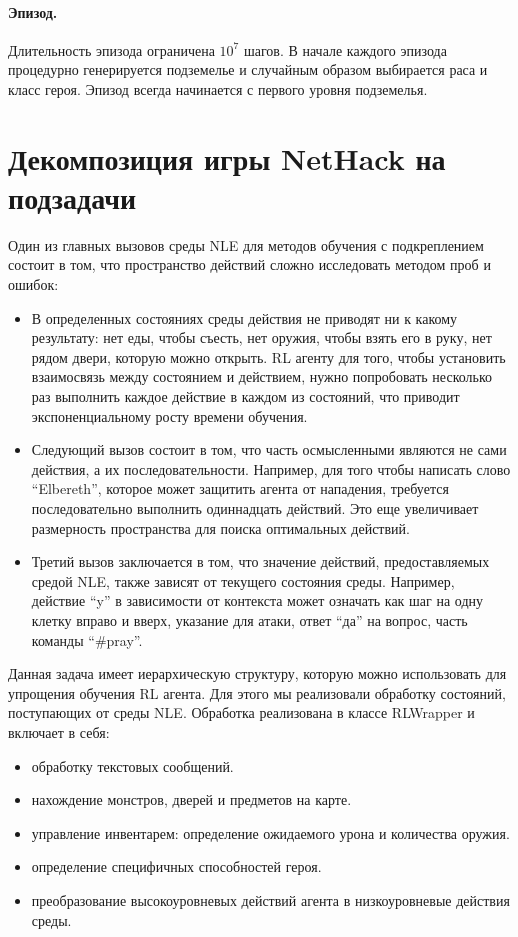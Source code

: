 \paragraph{Эпизод.}
Длительность эпизода ограничена $10^7$ шагов. В начале каждого эпизода процедурно генерируется подземелье и случайным образом выбирается раса и класс героя. Эпизод всегда начинается с первого уровня подземелья. 


\section{Декомпозиция игры NetHack на подзадачи}

Один из главных вызовов среды NLE для методов обучения с подкреплением состоит в том, что пространство действий сложно исследовать методом проб и ошибок:

\begin{itemize}
    \item В определенных состояниях среды действия не приводят ни к какому результату: нет еды, чтобы съесть, нет оружия, чтобы взять его в руку, нет рядом двери, которую можно открыть. RL агенту для того, чтобы установить взаимосвязь между состоянием и действием, нужно попробовать несколько раз выполнить каждое действие в каждом из состояний, что приводит экспоненциальному росту времени обучения. 
    \item Следующий вызов состоит в том, что часть осмысленными являются не сами действия, а их последовательности. Например, для того чтобы написать слово ``Elbereth'', которое может защитить агента от нападения, требуется последовательно выполнить одиннадцать действий. Это еще увеличивает размерность пространства для поиска оптимальных действий. 
    \item Третий вызов заключается в том, что значение действий, предоставляемых средой NLE, также зависят от текущего состояния среды. Например, действие ``y'' в зависимости от контекста может означать как шаг на одну клетку вправо и вверх, указание для атаки, ответ ``да'' на вопрос, часть команды ``\#pray''.
\end{itemize}

Данная задача имеет иерархическую структуру, которую можно использовать для упрощения обучения RL агента. Для этого мы реализовали обработку состояний, поступающих от среды NLE. Обработка реализована в классе RLWrapper и включает в себя:

\begin{itemize}
    \item обработку текстовых сообщений.
    \item нахождение монстров, дверей и предметов на карте.
    \item управление инвентарем: определение ожидаемого урона и количества оружия.
    \item определение специфичных способностей героя.
    \item преобразование высокоуровневых действий агента в низкоуровневые действия среды.
\end{itemize}


